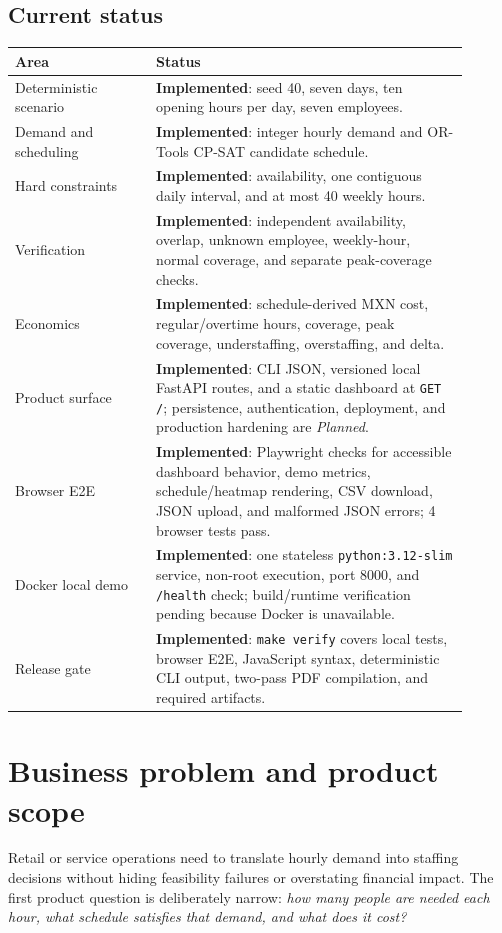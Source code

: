 \documentclass[11pt,a4paper]{article}
\newcommand{\planned}{\textit{Planned}}
\newcommand{\implemented}{\textbf{Implemented}}
\begin{document}
\subsection{Current status}
\begin{tabular}{p{0.28\linewidth}p{0.62\linewidth}}
\toprule
Area & Status\\
\midrule
Deterministic scenario & \implemented: seed 40, seven days, ten opening hours per day, seven employees.\\
Demand and scheduling & \implemented: integer hourly demand and OR-Tools CP-SAT candidate schedule.\\
Hard constraints & \implemented: availability, one contiguous daily interval, and at most 40 weekly hours.\\
Verification & \implemented: independent availability, overlap, unknown employee, weekly-hour, normal coverage, and separate peak-coverage checks.\\
Economics & \implemented: schedule-derived MXN cost, regular/overtime hours, coverage, peak coverage, understaffing, overstaffing, and delta.\\
Product surface & \implemented: CLI JSON, versioned local FastAPI routes, and a static dashboard at \texttt{GET /}; persistence, authentication, deployment, and production hardening are \planned.\\
Browser E2E & \implemented: Playwright checks for accessible dashboard behavior, demo metrics, schedule/heatmap rendering, CSV download, JSON upload, and malformed JSON errors; 4 browser tests pass.\\
Docker local demo & \implemented: one stateless \texttt{python:3.12-slim} service, non-root execution, port 8000, and \texttt{/health} check; build/runtime verification pending because Docker is unavailable.\\
Release gate & \implemented: \texttt{make verify} covers local tests, browser E2E, JavaScript syntax, deterministic CLI output, two-pass PDF compilation, and required artifacts.\\
\bottomrule
\end{tabular}

\section{Business problem and product scope}
Retail or service operations need to translate hourly demand into staffing decisions without hiding feasibility failures or overstating financial impact. The first product question is deliberately narrow: \emph{how many people are needed each hour, what schedule satisfies that demand, and what does it cost?}
\end{document}
